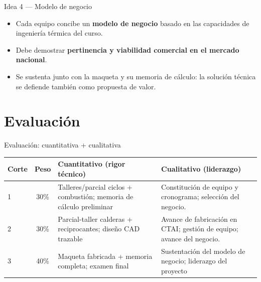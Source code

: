 \documentclass[aspectratio=169]{beamer}
\begin{document}
\begin{frame}{Idea 4 — Modelo de negocio}
  \begin{itemize}
    \item Cada equipo concibe un \textbf{modelo de negocio} basado en las capacidades de ingeniería térmica
      del curso.
    \item Debe demostrar \textbf{pertinencia y viabilidad comercial en el mercado nacional}.
    \item Se sustenta junto con la maqueta y su memoria de cálculo: la solución técnica se defiende también
      como propuesta de valor.
  \end{itemize}
\end{frame}

\section{Evaluación}
\begin{frame}{Evaluación: cuantitativa + cualitativa}
  \begin{table}
    \small
    \begin{tabularx}{\linewidth}{lcXX}
      \toprule
      \textbf{Corte} & \textbf{Peso} & \textbf{Cuantitativo (rigor técnico)} & \textbf{Cualitativo (liderazgo)} \\
      \midrule
      1 & 30\% & Talleres/parcial ciclos + combustión; memoria de cálculo preliminar & Constitución de
        equipo y cronograma; selección del negocio. \\
      2 & 30\% & Parcial-taller calderas + reciprocantes; diseño CAD trazable & Avance de fabricación en
        CTAI; gestión de equipo; avance del negocio. \\
      3 & 40\% & Maqueta fabricada + memoria completa; examen final & Sustentación del modelo de negocio;
        liderazgo del proyecto \\
      \bottomrule
    \end{tabularx}
  \end{table}
\end{frame}

\end{document}
